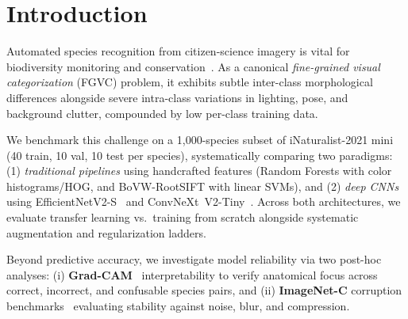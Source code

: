 \section{Introduction}
\label{sec:intro}
 
Automated species recognition from citizen-science imagery is vital for biodiversity monitoring and conservation~\cite{vanhorn2021inaturalist}. As a canonical \emph{fine-grained visual categorization} (FGVC) problem, it exhibits subtle inter-class morphological differences alongside severe intra-class variations in lighting, pose, and background clutter, compounded by low per-class training data.
 
We benchmark this challenge on a 1{,}000-species subset of iNaturalist-2021 mini~\cite{vanhorn2021inaturalist} (40 train, 10 val, 10 test per species), systematically comparing two paradigms: (1) \emph{traditional pipelines} using handcrafted features (Random Forests with color histograms/HOG, and BoVW-RootSIFT with linear SVMs), and (2) \emph{deep CNNs} using EfficientNetV2-S~\cite{tan2021efficientnetv2} and ConvNeXt~V2-Tiny~\cite{woo2023convnextv2}. Across both architectures, we evaluate transfer learning vs.\ training from scratch alongside systematic augmentation and regularization ladders.
 
Beyond predictive accuracy, we investigate model reliability via two post-hoc analyses: (i) \textbf{Grad-CAM}~\cite{selvaraju2017grad} interpretability to verify anatomical focus across correct, incorrect, and confusable species pairs, and (ii) \textbf{ImageNet-C} corruption benchmarks~\cite{hendrycks2019robustness} evaluating stability against noise, blur, and compression.